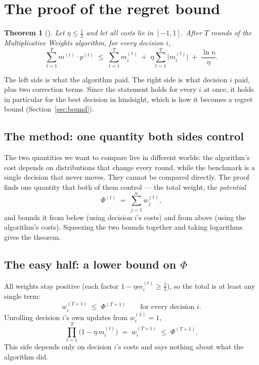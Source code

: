 \documentclass[11pt,a4paper]{article}
\theoremstyle{plain}
\newtheorem{theorem}{Theorem}[section]
\theoremstyle{definition}
\begin{document}
\clearpage
\section{The proof of the regret bound}
\label{sec:proof}

\begin{theorem}[{\cite[Theorem~2.1]{AHK12}}]
\label{thm:mw}
Let $\eta \le \frac12$ and let all costs lie in $[-1,1]$. After $T$ rounds of the Multiplicative Weights algorithm, for \emph{every} decision $i$,
\begin{equation}
\label{eq:thm}
\sum_{t=1}^{T} m^{(t)}\cdot p^{(t)} \;\le\; \sum_{t=1}^{T} m^{(t)}_i \;+\; \eta \sum_{t=1}^{T} \bigl|m^{(t)}_i\bigr| \;+\; \frac{\ln n}{\eta}.
\end{equation}
\end{theorem}

The left side is what the algorithm paid. The right side is what decision $i$ paid, plus two correction terms. Since the statement holds for every $i$ at once, it holds in particular for the best decision in hindsight, which is how it becomes a regret bound (Section~\ref{sec:bound}).

\subsection{The method: one quantity both sides control}

The two quantities we want to compare live in different worlds: the algorithm's cost depends on distributions that change every round, while the benchmark is a single decision that never moves. They cannot be compared directly. The proof finds one quantity that both of them control --- the total weight, the \emph{potential}
\[
\Phi^{(t)} \;=\; \sum_{j=1}^{n} w^{(t)}_j ,
\]
and bounds it from below (using decision $i$'s costs) and from above (using the algorithm's costs). Squeezing the two bounds together and taking logarithms gives the theorem.

\subsection{The easy half: a lower bound on \texorpdfstring{$\Phi$}{Phi}}

All weights stay positive (each factor $1-\eta m^{(t)}_i \ge \frac12$), so the total is at least any single term:
\[
w^{(T+1)}_i \;\le\; \Phi^{(T+1)} \qquad\text{for every decision } i .
\]
Unrolling decision $i$'s own updates from $w^{(1)}_i = 1$,
\begin{equation}
\label{eq:lowerPhi}
\prod_{t=1}^{T}\bigl(1-\eta\, m^{(t)}_i\bigr) \;=\; w^{(T+1)}_i \;\le\; \Phi^{(T+1)} .
\end{equation}
This side depends only on decision $i$'s costs and says nothing about what the algorithm did.
\end{document}

